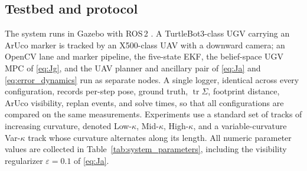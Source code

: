 \documentclass{ifacconf}
\DeclareMathOperator{\tr}{tr}
\begin{document}
\subsection{Testbed and protocol}
\label{sec:res_setup}
The system runs in Gazebo with ROS\,2 \citep{ros2}. A TurtleBot3-class UGV carrying an ArUco marker is
tracked by an X500-class UAV with a downward camera; an OpenCV lane and marker pipeline, the five-state
EKF, the belief-space UGV MPC of \eqref{eq:Jg}, and the UAV planner and ancillary pair of \eqref{eq:Ja}
and \eqref{eq:error_dynamics} run as separate nodes. A single logger, identical across every
configuration, records per-step pose, ground truth, $\tr\Sigma$, footprint distance, ArUco visibility,
replan events, and solve times, so that all configurations are compared on the same measurements.
Experiments use a standard set of tracks of increasing curvature, denoted Low-$\kappa$, Mid-$\kappa$,
High-$\kappa$, and a variable-curvature Var-$\kappa$ track whose curvature alternates along its length.
All numeric parameter values are collected in Table~\ref{tab:system_parameters}, including the visibility
regularizer $\varepsilon=0.1$ of \eqref{eq:Ja}.
\end{document}
